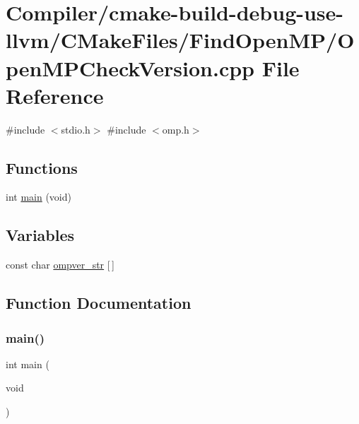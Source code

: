 \hypertarget{use-llvm_2_c_make_files_2_find_open_m_p_2_open_m_p_check_version_8cpp}{}\section{Compiler/cmake-\/build-\/debug-\/use-\/llvm/\+C\+Make\+Files/\+Find\+Open\+M\+P/\+Open\+M\+P\+Check\+Version.cpp File Reference}
\label{use-llvm_2_c_make_files_2_find_open_m_p_2_open_m_p_check_version_8cpp}
{\ttfamily \#include $<$stdio.\+h$>$}\newline
{\ttfamily \#include $<$omp.\+h$>$}\newline
\subsection*{Functions}
\begin{DoxyCompactItemize}
\item 
int \mbox{\hyperlink{use-llvm_2_c_make_files_2_find_open_m_p_2_open_m_p_check_version_8cpp_a840291bc02cba5474a4cb46a9b9566fe}{main}} (void)
\end{DoxyCompactItemize}
\subsection*{Variables}
\begin{DoxyCompactItemize}
\item 
const char \mbox{\hyperlink{use-llvm_2_c_make_files_2_find_open_m_p_2_open_m_p_check_version_8cpp_af60b110d3c4507a1d6ffd66d846f1c58}{ompver\+\_\+str}} \mbox{[}$\,$\mbox{]}
\end{DoxyCompactItemize}


\subsection{Function Documentation}
\mbox{\label{use-llvm_2_c_make_files_2_find_open_m_p_2_open_m_p_check_version_8cpp_a840291bc02cba5474a4cb46a9b9566fe}} 
\subsubsection{\texorpdfstring{main()}{main()}}
{\footnotesize\ttfamily int main (\begin{DoxyParamCaption}\item[{void}]{ }\end{DoxyParamCaption})}



